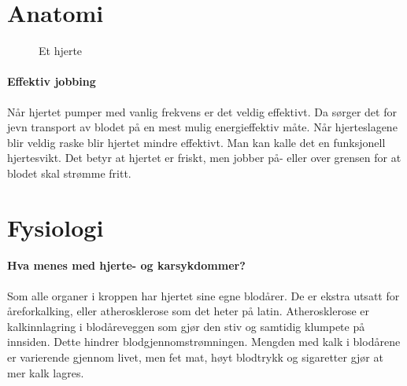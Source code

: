		\section{Anatomi}
					\begin{figure}[ht]
                      \centering
                      \caption{Et hjerte}
                    \end{figure}    


			\paragraph{Effektiv jobbing\\}
				Når hjertet pumper med vanlig frekvens er det veldig effektivt. Da sørger det for jevn transport av blodet på en mest mulig energieffektiv måte. Når hjerteslagene blir veldig raske blir hjertet mindre effektivt\cite{FA-saladin}. Man kan kalle det en funksjonell hjertesvikt. Det betyr at hjertet er friskt, men jobber på- eller over grensen for at blodet skal strømme fritt.
		\section{Fysiologi}	
			\paragraph{Hva menes med hjerte- og karsykdommer?\\}\label{sec:athero}
				Som alle organer i kroppen har hjertet sine egne blodårer. De er ekstra utsatt for åreforkalking, eller atherosklerose som det heter på latin. Atherosklerose er kalkinnlagring i blodåreveggen som gjør den stiv og samtidig klumpete på innsiden. Dette hindrer blodgjennomstrømningen. Mengden med kalk i blodårene er varierende gjennom livet, men fet mat, høyt blodtrykk og sigaretter gjør at mer kalk lagres. 
